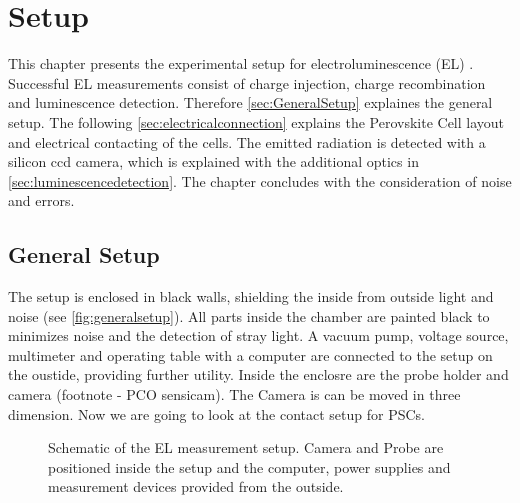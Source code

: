 \chapter{Setup}
This chapter presents the experimental setup for electroluminescence (EL) . Successful EL measurements consist of charge injection, charge recombination and luminescence detection. Therefore \autoref{sec:GeneralSetup} explaines the general setup. The following \autoref{sec:electricalconnection} explains the Perovskite Cell layout and electrical contacting of the cells. The emitted radiation is detected with a silicon ccd camera, which is explained with the additional optics in \autoref{sec:luminescencedetection}. The chapter concludes with the consideration of noise and errors.

\section{General Setup}\label{sec:GeneralSetup}
The setup is enclosed in black walls, shielding the inside from outside light and noise (see \autoref{fig:generalsetup}). All parts inside the chamber are painted black to minimizes noise and the detection of stray light. A vacuum pump, voltage source, multimeter and operating table with a computer are connected to the setup on the oustide, providing further utility. Inside the enclosre are the probe holder and camera (footnote - PCO sensicam). The Camera is can be moved in three dimension. Now we are going to look at the contact setup for PSCs.
\begin{figure}[h]
	\centering
	
	\caption{Schematic of the EL measurement setup. Camera and Probe are positioned inside the setup and the computer, power supplies and measurement devices provided from the outside.}
	\label{fig:generalsetup}
\end{figure}


